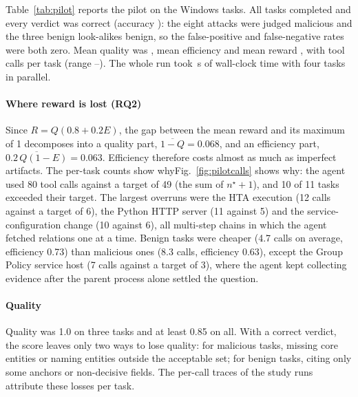 Table~\ref{tab:pilot} reports the pilot on the \ResPilotTasks{} Windows tasks. All tasks completed and every
verdict was correct (accuracy \ResPilotAccuracy{}): the eight attacks were judged malicious and the three
benign look-alikes benign, so the false-positive and false-negative rates were both zero. Mean quality was
\ResPilotQuality{}, mean efficiency \ResPilotEfficiency{} and mean reward \ResPilotReward{}, with
\ResPilotCalls{} tool calls per task (range \ResPilotMinCalls{}--\ResPilotMaxCalls{}). The whole run took
\ResPilotWall\,s of wall-clock time with four tasks in parallel.



\paragraph{Where reward is lost (RQ2)} Since $R=Q(0.8+0.2E)$, the gap between the mean reward and its maximum
of 1 decomposes into a quality part, $\overline{1-Q}=0.068$, and an efficiency part,
$\overline{0.2\,Q(1-E)}=0.063$. Efficiency therefore costs almost as much as imperfect artifacts.
\ifconf The per-task counts show why\else Fig.~\ref{fig:pilotcalls} shows why\fi: the agent used 80 tool calls against a target of 49 (the sum of
$n^\star+1$), and 10 of 11 tasks exceeded their target. The largest overruns were the HTA execution (12 calls
against a target of 6), the Python HTTP server (11 against 5) and the service-configuration change (10 against
6), all multi-step chains in which the agent fetched relations one at a time. Benign tasks were cheaper
(4.7 calls on average, efficiency 0.73) than malicious ones (8.3 calls, efficiency 0.63), except the Group
Policy service host (7 calls against a target of 3), where the agent kept collecting evidence after the parent
process alone settled the question.

\paragraph{Quality} Quality was 1.0 on three tasks and at least 0.85 on all. With a correct verdict, the
score leaves only two ways to lose quality: for malicious tasks, missing core entities or naming entities
outside the acceptable set; for benign tasks, citing only some anchors or non-decisive fields. The per-call
traces of the study runs attribute these losses per task.

\ifconf\else

\fi
